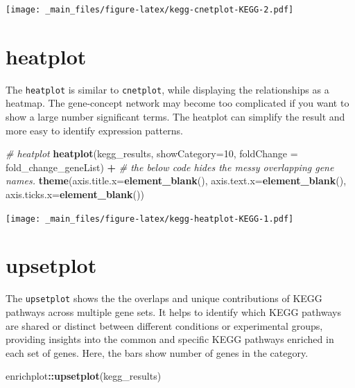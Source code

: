\documentclass[
]{book}
\newenvironment{Shaded}{\begin{snugshade}}{\end{snugshade}}
\newcommand{\AttributeTok}[1]{\textcolor[rgb]{0.13,0.29,0.53}{#1}}
\newcommand{\CommentTok}[1]{\textcolor[rgb]{0.56,0.35,0.01}{\textit{#1}}}
\newcommand{\DecValTok}[1]{\textcolor[rgb]{0.00,0.00,0.81}{#1}}
\newcommand{\FunctionTok}[1]{\textcolor[rgb]{0.13,0.29,0.53}{\textbf{#1}}}
\newcommand{\NormalTok}[1]{#1}
\newcommand{\SpecialCharTok}[1]{\textcolor[rgb]{0.81,0.36,0.00}{\textbf{#1}}}
\begin{document}
\texttt{[image: \_main\_files/figure-latex/kegg-cnetplot-KEGG-2.pdf]}

\hypertarget{heatplot}{%
\section{heatplot}\label{heatplot}}

The \texttt{heatplot} is similar to \texttt{cnetplot}, while displaying the relationships as a heatmap. The gene-concept network may become too complicated if you want to show a large number significant terms. The heatplot can simplify the result and more easy to identify expression patterns.

\begin{Shaded}
\begin{Highlighting}[]
\CommentTok{\# heatplot}
\FunctionTok{heatplot}\NormalTok{(kegg\_results, }\AttributeTok{showCategory=}\DecValTok{10}\NormalTok{, }\AttributeTok{foldChange =}\NormalTok{ fold\_change\_geneList) }\SpecialCharTok{+}
  \CommentTok{\# the below code hides the messy overlapping gene names.}
  \FunctionTok{theme}\NormalTok{(}\AttributeTok{axis.title.x=}\FunctionTok{element\_blank}\NormalTok{(),}
        \AttributeTok{axis.text.x=}\FunctionTok{element\_blank}\NormalTok{(),}
        \AttributeTok{axis.ticks.x=}\FunctionTok{element\_blank}\NormalTok{())}
\end{Highlighting}
\end{Shaded}

\texttt{[image: \_main\_files/figure-latex/kegg-heatplot-KEGG-1.pdf]}

\hypertarget{upsetplot}{%
\section{upsetplot}\label{upsetplot}}

The \texttt{upsetplot} shows the the overlaps and unique contributions of KEGG pathways across multiple gene sets. It helps to identify which KEGG pathways are shared or distinct between different conditions or experimental groups, providing insights into the common and specific KEGG pathways enriched in each set of genes. Here, the bars show number of genes in the category.

\begin{Shaded}
\begin{Highlighting}[]
\NormalTok{enrichplot}\SpecialCharTok{::}\FunctionTok{upsetplot}\NormalTok{(kegg\_results)}
\end{Highlighting}
\end{Shaded}
\end{document}
